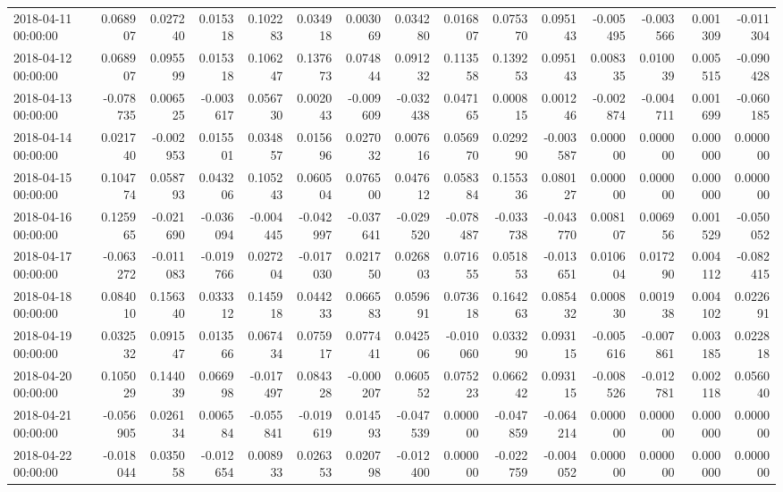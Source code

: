 \begin{tabular}{lrrrrrrrrrrrrrr}
2018-04-11 00:00:00 & 0.068907 & 0.027240 & 0.015318 & 0.102283 & 0.034918 & 0.003069 & 0.034280 & 0.016807 & 0.075370 & 0.095143 & -0.005495 & -0.003566 & 0.001309 & -0.011304 \\
2018-04-12 00:00:00 & 0.068907 & 0.095599 & 0.015318 & 0.106247 & 0.137673 & 0.074844 & 0.091232 & 0.113558 & 0.139253 & 0.095143 & 0.008335 & 0.010039 & 0.005515 & -0.090428 \\
2018-04-13 00:00:00 & -0.078735 & 0.006525 & -0.003617 & 0.056730 & 0.002043 & -0.009609 & -0.032438 & 0.047165 & 0.000815 & 0.001246 & -0.002874 & -0.004711 & 0.001699 & -0.060185 \\
2018-04-14 00:00:00 & 0.021740 & -0.002953 & 0.015501 & 0.034857 & 0.015696 & 0.027032 & 0.007616 & 0.056970 & 0.029290 & -0.003587 & 0.000000 & 0.000000 & 0.000000 & 0.000000 \\
2018-04-15 00:00:00 & 0.104774 & 0.058793 & 0.043206 & 0.105243 & 0.060504 & 0.076500 & 0.047612 & 0.058384 & 0.155336 & 0.080127 & 0.000000 & 0.000000 & 0.000000 & 0.000000 \\
2018-04-16 00:00:00 & 0.125965 & -0.021690 & -0.036094 & -0.004445 & -0.042997 & -0.037641 & -0.029520 & -0.078487 & -0.033738 & -0.043770 & 0.008107 & 0.006956 & 0.001529 & -0.050052 \\
2018-04-17 00:00:00 & -0.063272 & -0.011083 & -0.019766 & 0.027204 & -0.017030 & 0.021750 & 0.026803 & 0.071655 & 0.051853 & -0.013651 & 0.010604 & 0.017290 & 0.004112 & -0.082415 \\
2018-04-18 00:00:00 & 0.084010 & 0.156340 & 0.033312 & 0.145918 & 0.044233 & 0.066583 & 0.059691 & 0.073618 & 0.164263 & 0.085432 & 0.000830 & 0.001938 & 0.004102 & 0.022691 \\
2018-04-19 00:00:00 & 0.032532 & 0.091547 & 0.013566 & 0.067434 & 0.075917 & 0.077441 & 0.042506 & -0.010060 & 0.033290 & 0.093115 & -0.005616 & -0.007861 & 0.003185 & 0.022818 \\
2018-04-20 00:00:00 & 0.105029 & 0.144039 & 0.066998 & -0.017497 & 0.084328 & -0.000207 & 0.060552 & 0.075223 & 0.066242 & 0.093115 & -0.008526 & -0.012781 & 0.002118 & 0.056040 \\
2018-04-21 00:00:00 & -0.056905 & 0.026134 & 0.006584 & -0.055841 & -0.019619 & 0.014593 & -0.047539 & 0.000000 & -0.047859 & -0.064214 & 0.000000 & 0.000000 & 0.000000 & 0.000000 \\
2018-04-22 00:00:00 & -0.018044 & 0.035058 & -0.012654 & 0.008933 & 0.026353 & 0.020798 & -0.012400 & 0.000000 & -0.022759 & -0.004052 & 0.000000 & 0.000000 & 0.000000 & 0.000000 \\

\end{tabular}
